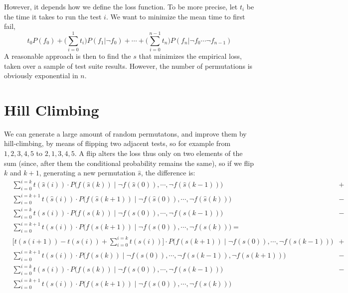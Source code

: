 \documentclass[12pt]{article}
\begin{document}
However, it depends how we define the loss function. To be more precise, let $t_i$ be the time it takes to run the test $i$. We want to minimize the mean time to first fail,
\[ t_0 P(f_0) + \big(\sum_{i=0}^1 t_i\big) P(f_1 | \neg f_0)  + \cdots + \big(\sum_{i=0}^{n-1} t_n\big) P(f_n | \neg f_0 \cdots \neg f_{n-1})\]
A reasonable approach is then to find the $s$ that minimizes the empirical loss, taken over a sample of test suite results. However, the number of permutations is obviously exponential in $n$.



\section{Hill Climbing}

We can generate a large amount of random permutatons, and improve them by hill-climbing, by means of flipping two adjacent tests, so for example from $1,2,3,4,5$ to $2,1,3,4,5$. A flip alters the loss thus only on two elements of the sum (since, after them the conditional probability remains the same), so if we flip $k$ and $k+1$, generating a new permutation $\hat{s}$, the difference is:
\begin{align}
  &\sum_{i=0}^{i=k} t(\hat{s}(i)) \cdot P\Big(f(\hat{s}(k)) \; \Big| \; \neg f(\hat{s}(0)), \cdots, \neg f(\hat{s}(k-1)) \Big) &+ \\
  &\sum_{i=0}^{i=k+1} t(\hat{s}(i)) \cdot P\Big(f(\hat{s}(k+1)) \; \Big| \; \neg f(\hat{s}(0)), \cdots, \neg f(\hat{s}(k)) \Big) &- \\
  &\sum_{i=0}^{i=k} t(s(i)) \cdot P\Big(f(s(k)) \; \Big| \; \neg f(s(0)), \cdots, \neg f(s(k-1)) \Big) &- \\
  &\sum_{i=0}^{i=k+1} t(s(i)) \cdot P\Big(f(s(k+1)) \; \Big| \; \neg f(s(0)), \cdots, \neg f(s(k)) \Big) = \\
  &\Big[ t(s(i+1)) - t(s(i)) + \sum_{i=0}^{i=k} t(s(i)) \Big] \cdot P\Big(f(s(k+1)) \; \Big| \; \neg f(s(0)), \cdots, \neg f(s(k-1)) \Big) &+ \\
  &\sum_{i=0}^{i=k+1} t(s(i)) \cdot P\Big(f(s(k)) \; \Big| \; \neg f(s(0)), \cdots, \neg f(s(k-1)), \neg f(s(k+1)) \Big) &- \\
  &\sum_{i=0}^{i=k} t(s(i)) \cdot P\Big(f(s(k)) \; \Big| \; \neg f(s(0)), \cdots, \neg f(s(k-1)) \Big) &- \\
  &\sum_{i=0}^{i=k+1} t(s(i)) \cdot P\Big(f(s(k+1)) \; \Big| \; \neg f(s(0)), \cdots, \neg f(s(k)) \Big)
\end{align}
\end{document}

